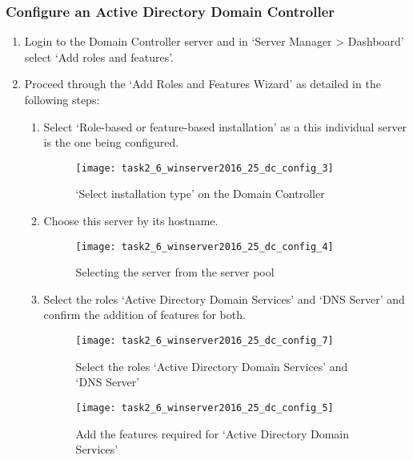 \subsubsection{Configure an Active Directory Domain Controller}
\begin{enumerate}[series=task2methodology3]
  \item Login to the Domain Controller server and in `Server Manager > Dashboard' select `Add roles and features'.
  \item Proceed through the `Add Roles and Features Wizard' as detailed in the following steps:
   \begin{enumerate}[label=(\alph*)]
     \item Select `Role-based or feature-based installation' as a this individual server is the one being configured.
       \begin{figure}[H]
         \centering
         \captionsetup{skip=2pt}
         \texttt{[image: task2\_6\_winserver2016\_25\_dc\_config\_3]}
         \caption{`Select installation type' on the Domain Controller}
         \label{fig:task2:vspherec_windc2_c3}
       \end{figure}
      \item Choose this server by its hostname.
        \begin{figure}[H]
          \centering
          \captionsetup{skip=2pt}
          \texttt{[image: task2\_6\_winserver2016\_25\_dc\_config\_4]}
          \caption{Selecting the server from the server pool}
          \label{fig:task2:vspherec_windc2_c4}
        \end{figure}
      \item Select the roles `Active Directory Domain Services' and `DNS Server' and confirm the addition of features for both.
        \begin{figure}[H]
          \centering
          \captionsetup{skip=2pt}
          \texttt{[image: task2\_6\_winserver2016\_25\_dc\_config\_7]}
          \caption{Select the roles `Active Directory Domain Services' and `DNS Server'}
          \label{fig:task2:vspherec_windc2_c7}
        \end{figure}
        \begin{figure}[H]
          \centering
          \captionsetup{skip=2pt}
          \texttt{[image: task2\_6\_winserver2016\_25\_dc\_config\_5]}
          \caption{Add the features required for `Active Directory Domain Services'}
          \label{fig:task2:vspherec_windc2_c5}
        \end{figure}

\end{enumerate}
\end{enumerate}
